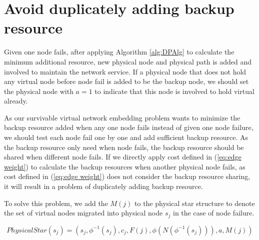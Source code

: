 
\section{Avoid  duplicately adding backup resource}


Given one node fails, after applying Algorithm \ref{alg:DPAlg} to calculate the minimum additional resource, new physical node and physical path is added and involved to maintain the network service. If a physical node that does not hold any virtual node before node fail is added to be the backup node, we should set the physical node with $a=1$ to indicate that this node is involved to hold virtual already.

 As our survivable virtual network embedding problem wants to minimize the backup resource added when any one node fails instead of given one node failure, we should test each node fail one by one and add sufficient backup resource. As the backup resource only need when node fails,  the  backup resource  should be shared when different node fails. If we directly apply cost defined in (\ref{eq:edge weight}) to calculate the backup resources when another physical node fails, as cost defined in (\ref{eq:edge weight}) does not consider the backup resource sharing, it will result in a problem of duplicately adding backup resource.

 To  solve this problem,  we add the  $M(j)$ to the physical star structure to denote the set of virtual nodes migrated into  physical node $s_j$ in the case of node failure.


\begin{equation}
PhysicalStar(s_j)=(s_j, \phi^{-1}( s_j), c_j, F(j), \phi(N(\phi^{-1}( s_j))), a, M(j))
\end{equation}

